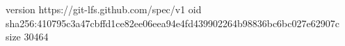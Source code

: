 version https://git-lfs.github.com/spec/v1
oid sha256:410795c3a47cbffd1ce82ee06eea94e4fd439902264b98836bc6bc027e62907c
size 30464
